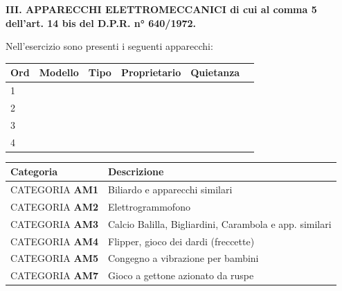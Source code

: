 \documentclass[12pt]{article}
\newcommand\annoIscrizione{$annoIscrizione}
\begin{document}
\begin{center}
    \textbf{III. APPARECCHI ELETTROMECCANICI di cui al comma 5 dell’art. 14 bis del D.P.R. n° 640/1972.}
\end{center}

Nell'esercizio sono presenti i seguenti apparecchi:
\begin{table}[h]
    \centering
    \begin{tabular}{|p{2.5cm}|p{2.5cm}|p{2.5cm}|p{2.5cm}|p{2.5cm}|p{2.5cm}|}
        \hline
        Ord & Modello & Tipo & Proprietario & Quietanza \\
        \hline
        1 \newline &  &  &  & \\
        \hline
        2 \newline &  &  &  & \\
        \hline
        3 \newline &  &  &  & \\
        \hline
        4 \newline &  &  &  & \\
        \hline
    \end{tabular}
\end{table}

\begin{table}[h]
    \centering
    \begin{tabular}{|l|l|}
        \hline
         Categoria & Descrizione \\
        \hline
         CATEGORIA \textbf{AM1} & Biliardo e apparecchi similari\\
        \hline
         CATEGORIA \textbf{AM2} & Elettrogrammofono\\
        \hline
         CATEGORIA \textbf{AM3} & Calcio Balilla, Bigliardini, Carambola e app. similari\\
        \hline
         CATEGORIA \textbf{AM4} & Flipper, gioco dei dardi (freccette)\\
        \hline
         CATEGORIA \textbf{AM5} & Congegno a vibrazione per bambini\\
        \hline
         CATEGORIA \textbf{AM7} & Gioco a gettone azionato da ruspe\\
        \hline
    \end{tabular}
\end{table}

\end{document}
